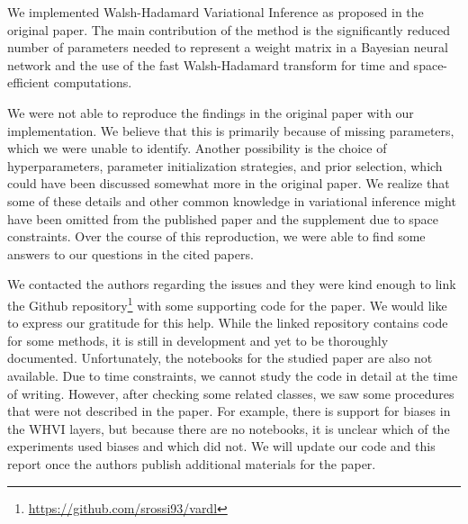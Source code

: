 We implemented Walsh-Hadamard Variational Inference as proposed in the original paper.
The main contribution of the method is the significantly reduced number of parameters needed to represent a weight matrix in a Bayesian neural network and the use of the fast Walsh-Hadamard transform for time and space-efficient computations.

We were not able to reproduce the findings in the original paper with our implementation.
We believe that this is primarily because of missing parameters, which we were unable to identify.
Another possibility is the choice of hyperparameters, parameter initialization strategies, and prior selection, which could have been discussed somewhat more in the original paper.
We realize that some of these details and other common knowledge in variational inference might have been omitted from the published paper and the supplement due to space constraints.
Over the course of this reproduction, we were able to find some answers to our questions in the cited papers.

We contacted the authors regarding the issues and they were kind enough to link the Github repository\footnote{\url{https://github.com/srossi93/vardl}} with some supporting code for the paper.
We would like to express our gratitude for this help.
While the linked repository contains code for some methods, it is still in development and yet to be thoroughly documented.
Unfortunately, the notebooks for the studied paper are also not available.
Due to time constraints, we cannot study the code in detail at the time of writing.
However, after checking some related classes, we saw some procedures that were not described in the paper.
For example, there is support for biases in the WHVI layers, but because there are no notebooks, it is unclear which of the experiments used biases and which did not.
We will update our code and this report once the authors publish additional materials for the paper.
